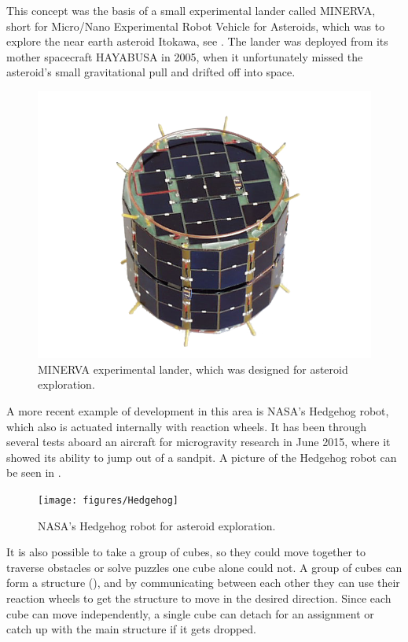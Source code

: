 This concept was the basis of a small experimental lander called MINERVA, short for Micro/Nano Experimental Robot Vehicle for Asteroids, which was to explore the near earth asteroid Itokawa, see . The lander was deployed from its mother spacecraft HAYABUSA in 2005, when it unfortunately missed the asteroid's small gravitational pull and drifted off into space.\cite{TYoshimitsu}
%
\begin{figure}[H] 
	\centering
	\includegraphics[scale=.7]{figures/MINERVA2}
	\caption{MINERVA experimental lander, which was designed for asteroid exploration.\cite{TYoshimitsu}}
	\label{MINERVA}
\end{figure}
%
A more recent example of development in this area is NASA's Hedgehog robot, which also is actuated internally with reaction wheels. It has been through several tests aboard an aircraft for microgravity research in June 2015, where it showed its ability to jump out of a sandpit. A picture of the Hedgehog robot can be seen in .\cite{ELandau}
%
\begin{figure}[H] 
	\centering
	\texttt{[image: figures/Hedgehog]}
	\caption{NASA's Hedgehog robot for asteroid exploration.\cite{ELandau}}
	\label{Hedgehog}
\end{figure}
%
It is also possible to take a group of cubes, so they could move together to traverse obstacles or solve puzzles one cube alone could not. A group of cubes can form a structure (), and by communicating between each other they can use their reaction wheels to get the structure to move in the desired direction. Since each cube can move independently, a single cube can detach for an assignment or catch up with the main structure if it gets dropped.\cite{JRomanishin}
